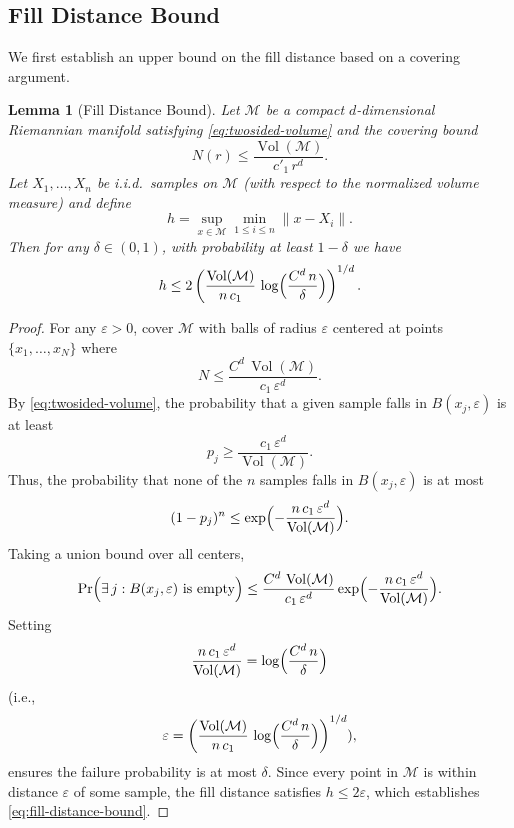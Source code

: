 \documentclass{article}
\theoremstyle{plain}
\newtheorem{lemma}[theorem]{Lemma}
\theoremstyle{definition}
\theoremstyle{remark}
\begin{document}
\subsection{Fill Distance Bound}

We first establish an upper bound on the fill distance based on a covering argument.

\begin{lemma}[Fill Distance Bound]\label{lem:fill-distance-bound}
Let \(\mathcal{M}\) be a compact \(d\)-dimensional Riemannian manifold satisfying \eqref{eq:twosided-volume} and the covering bound
\[
N(r) \le \frac{\operatorname{Vol}(\mathcal{M})}{c'_1\,r^d}.
\]
Let \(X_1,\dots,X_n\) be i.i.d.\ samples on \(\mathcal{M}\) (with respect to the normalized volume measure) and define
\[
h = \sup_{x\in \mathcal{M}} \min_{1\le i\le n}\|x-X_i\|.
\]
Then for any \(\delta\in (0,1)\), with probability at least \(1-\delta\) we have
\begin{equation}\label{eq:fill-distance-bound}
h \le 2\left(\frac{\operatorname{Vol}(\mathcal{M})}{n\,c_1}\,\log\Bigl(\frac{C^d\,n}{\delta}\Bigr)\right)^{1/d}.
\end{equation}
\end{lemma}

\begin{proof}
For any \(\varepsilon>0\), cover \(\mathcal{M}\) with balls of radius \(\varepsilon\) centered at points \(\{x_1,\dots,x_N\}\) where 
\[
N \le \frac{C^d\,\operatorname{Vol}(\mathcal{M})}{c_1\,\varepsilon^d}.
\]
By \eqref{eq:twosided-volume}, the probability that a given sample falls in \(B(x_j,\varepsilon)\) is at least
\[
p_j \ge \frac{c_1\,\varepsilon^d}{\operatorname{Vol}(\mathcal{M})}.
\]
Thus, the probability that none of the \(n\) samples falls in \(B(x_j,\varepsilon)\) is at most
\[
(1-p_j)^n \le \exp\Bigl(-\frac{n\,c_1\,\varepsilon^d}{\operatorname{Vol}(\mathcal{M})}\Bigr).
\]
Taking a union bound over all centers,
\[
\Pr\Bigl(\exists\, j: B(x_j,\varepsilon) \text{ is empty}\Bigr) \le \frac{C^d\,\operatorname{Vol}(\mathcal{M})}{c_1\,\varepsilon^d}\exp\Bigl(-\frac{n\,c_1\,\varepsilon^d}{\operatorname{Vol}(\mathcal{M})}\Bigr).
\]
Setting 
\[
\frac{n\,c_1\,\varepsilon^d}{\operatorname{Vol}(\mathcal{M})} = \log\Bigl(\frac{C^d\,n}{\delta}\Bigr)
\]
(i.e., 
\[
\varepsilon = \left(\frac{\operatorname{Vol}(\mathcal{M})}{n\,c_1}\,\log\Bigl(\frac{C^d\,n}{\delta}\Bigr)\right)^{1/d}),
\]
ensures the failure probability is at most \(\delta\). Since every point in \(\mathcal{M}\) is within distance \(\varepsilon\) of some sample, the fill distance satisfies \(h\le 2\varepsilon\), which establishes \eqref{eq:fill-distance-bound}.
\end{proof}
\end{document}
